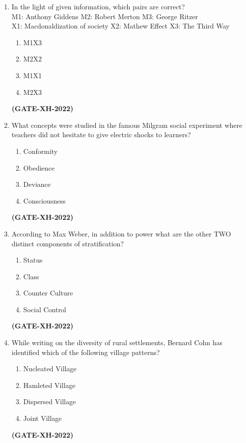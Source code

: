 \documentclass[journal]{IEEEtran}
\begin{document}
\begin{enumerate}
\item
In the light of given information, which pairs are correct?\\
M1: Anthony Giddens \hspace{1.9cm} M2: Robert Merton\hspace{0.4cm} M3: George Ritzer\\
X1: Macdonaldization of society\hspace{0.5cm} X2: Mathew Effect\hspace{0.5cm} X3: The Third Way
\begin{multicols}{4}
\begin{enumerate}
\item M1X3
\item M2X2
\item M1X1
\item M2X3
\end{enumerate}
\end{multicols}
\hfill\textbf{(GATE-XH-2022)}

\item
What concepts were studied in the famous Milgram social experiment where teachers did not hesitate to give electric shocks to learners?
\begin{multicols}{4}
\begin{enumerate}
\item Conformity
\item Obedience
\item Deviance
\item Consciousness
\end{enumerate}
\end{multicols}
\hfill\textbf{(GATE-XH-2022)}

\item
According to Max Weber, in addition to power what are the other TWO distinct components of stratification?
\begin{multicols}{4}
\begin{enumerate}
\item Status
\item Class
\item Counter Culture
\item Social Control
\end{enumerate}
\end{multicols}
\hfill\textbf{(GATE-XH-2022)}

\item
While writing on the diversity of rural settlements, Bernard Cohn has identified which of the following village patterns?
\begin{multicols}{2}
\begin{enumerate}
\item Nucleated Village
\item Hamleted Village
\item Dispersed Village
\item Joint Village
\end{enumerate}
\end{multicols}
\hfill\textbf{(GATE-XH-2022)}


\end{enumerate}
\end{document}

